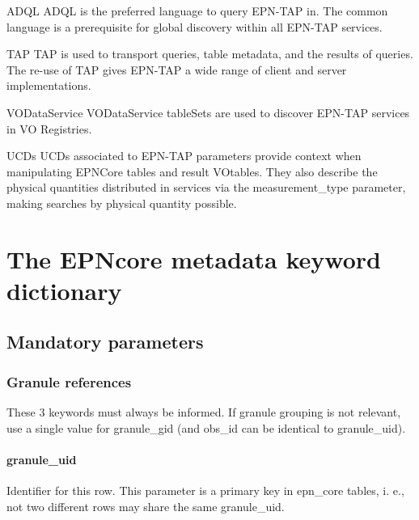 \documentclass[11pt,a4paper]{ivoa}
\begin{document}
\begin{bigdescription}
\item[ADQL \citep{2008ivoa.spec.1030O}] ADQL is the preferred language to
query EPN-TAP in.  The common language is a prerequisite for global
discovery within all EPN-TAP services.
\item[TAP \citep{2010ivoa.spec.0327D}] TAP is used to transport queries,
table metadata, and the results of queries.  The re-use of TAP gives
EPN-TAP a wide range of client and server implementations.
\item[VODataService \citep{2010ivoa.spec.1202P}] VODataService tableSets are used to
discover EPN-TAP services in VO Registries.
\item[UCDs \citep{2018ivoa.spec.0527M}] UCDs associated to EPN-TAP parameters provide context when manipulating EPNCore tables and result VOtables. They also describe the physical quantities distributed in services via the measurement\_type parameter, making searches by physical quantity possible.
\end{bigdescription}

\section{The EPNcore metadata keyword dictionary} 

\subsection{Mandatory parameters}

\subsubsection{Granule references}

These 3 keywords must always be informed. If granule grouping is not relevant, use a single value for granule\_gid (and obs\_id can be identical to granule\_uid).

\paragraph{granule\_uid}

Identifier for this row. This parameter is a primary key in epn\_core tables, i. e., not two different rows may share the same granule\_uid.
\end{document}
